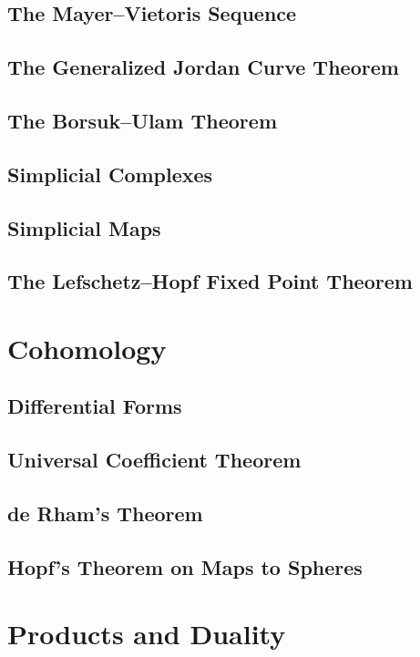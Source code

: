 \documentclass[oneside]{amsbook}
\numberwithin{prob}{section}
\begin{document}
\section{The Mayer--Vietoris Sequence}

\section{The Generalized Jordan Curve Theorem}

\section{The Borsuk--Ulam Theorem}

\section{Simplicial Complexes}

\section{Simplicial Maps}

\section{The Lefschetz--Hopf Fixed Point Theorem}


\chapter{Cohomology}
\setcounter{section}{1}
\section{Differential Forms}

\setcounter{section}{6}
\section{Universal Coefficient Theorem}

\setcounter{section}{8}
\section{de Rham's Theorem}

\setcounter{section}{10}
\section{Hopf's Theorem on Maps to Spheres}


\chapter{Products and Duality}
\end{document}
